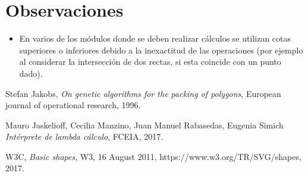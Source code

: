 \documentclass[a4paper,10pt]{article}
\begin{document}
\section*{Observaciones}

\begin{itemize}
    \item En varios de los módulos donde se deben realizar cálculos se utilizan cotas superiores o inferiores
    debido a la inexactitud de las operaciones (por ejemplo al considerar la intersección de dos rectas, si
    esta coincide con un punto dado).
\end{itemize}

\newpage{}
\begin{thebibliography}{9}

    Stefan Jakobs,
    \textit{On genetic algorithms for the packing of polygons},
    European journal of operational research,
    1996.

    Mauro Jaskelioff, Cecilia Manzino, Juan Manuel Rabasedas, Eugenia Simich
    \textit{Intérprete de lambda cálculo},
    FCEIA,
    2017.

    W3C, 
    \textit{Basic shapes},
    W3,
    16 August 2011,
    https://www.w3.org/TR/SVG/shapes,
    2017.
\end{thebibliography}
\end{document}
